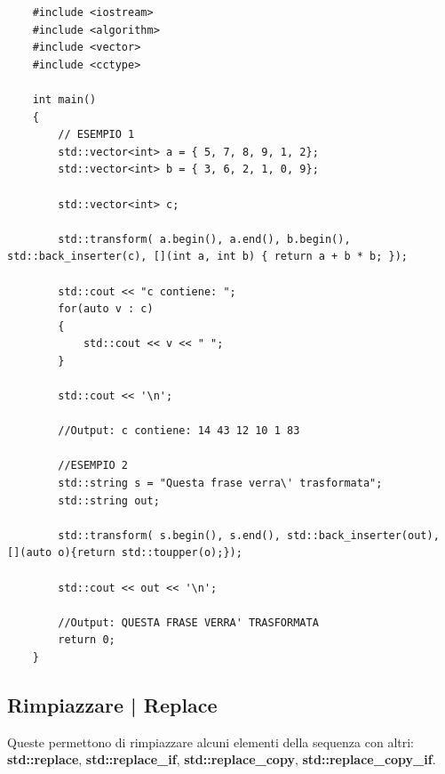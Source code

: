 \begin{lstlisting}
	#include <iostream>
	#include <algorithm>
	#include <vector>
	#include <cctype>
	
	int main()
	{
		// ESEMPIO 1
		std::vector<int> a = { 5, 7, 8, 9, 1, 2};
		std::vector<int> b = { 3, 6, 2, 1, 0, 9};
		
		std::vector<int> c;
		
		std::transform( a.begin(), a.end(), b.begin(), std::back_inserter(c), [](int a, int b) { return a + b * b; });
		
		std::cout << "c contiene: ";
		for(auto v : c)
		{
			std::cout << v << " ";
		}
		
		std::cout << '\n';
		
		//Output: c contiene: 14 43 12 10 1 83
		
		//ESEMPIO 2
		std::string s = "Questa frase verra\' trasformata";
		std::string out;
		
		std::transform( s.begin(), s.end(), std::back_inserter(out), [](auto o){return std::toupper(o);});
		
		std::cout << out << '\n';
		
		//Output: QUESTA FRASE VERRA' TRASFORMATA
		return 0;
	}
\end{lstlisting}

\subsection{Rimpiazzare | Replace}

\textsf{\small Queste permettono di rimpiazzare alcuni elementi della sequenza con altri: \textbf{std::replace}, \textbf{std::replace\_if}, \textbf{std::replace\_copy}, \textbf{std::replace\_copy\_if}.} \\

